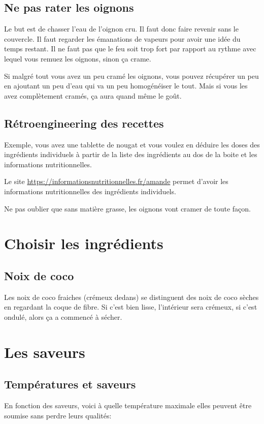 \documentclass[a4paper,twoside,openright]{report}
\begin{document}
\subsection{Ne pas rater les oignons}
Le but est de chasser l'eau de l'oignon cru. Il faut donc faire revenir sans le couvercle. Il faut regarder les émanations de vapeurs pour avoir une idée du temps restant. Il ne faut pas que le feu soit trop fort par rapport au rythme avec lequel vous remuez les oignons, sinon ça crame. 

Si malgré tout vous avez un peu cramé les oignons, vous pouvez récupérer un peu en ajoutant un peu d'eau qui va un peu homogénéiser le tout. Mais si vous les avez complètement cramés, ça aura quand même le goût.

\subsection{Rétroengineering des recettes}
Exemple, vous avez une tablette de nougat et vous voulez en déduire les doses des ingrédients individuels à partir de la liste des ingrédients au dos de la boite et les informations nutritionnelles. 

Le site \url{https://informationsnutritionnelles.fr/amande} permet d'avoir les informations nutritionnelles des ingrédients individuels.

\begin{remarque}
Ne pas oublier que sans matière grasse, les oignons vont cramer de toute façon.
\end{remarque}

\section{Choisir les ingrédients}
\subsection{Noix de coco}
Les noix de coco fraiches (crémeux dedans) se distinguent des noix de coco sèches en regardant la coque de fibre. Si c'est bien lisse, l'intérieur sera crémeux, si c'est ondulé, alors ça a commencé à sécher.

\section{Les saveurs}
\subsection{Températures et saveurs}
En fonction des saveurs, voici à quelle température maximale elles peuvent être soumise sans perdre leurs qualités:
\end{document}
